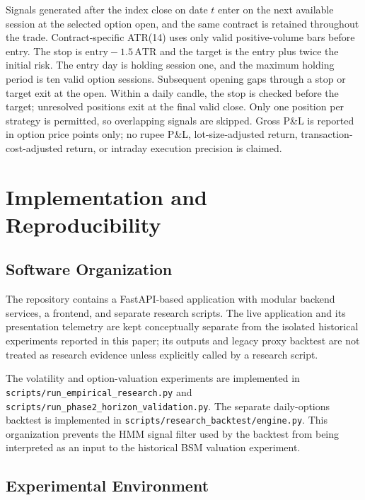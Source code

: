 \documentclass[journal]{IEEEtran}
\begin{document}
Signals generated after the index close on date $t$ enter on the next available session at the selected option open, and the same contract is retained throughout the trade. Contract-specific ATR(14) uses only valid positive-volume bars before entry. The stop is $\mathrm{entry}-1.5\,\mathrm{ATR}$ and the target is the entry plus twice the initial risk. The entry day is holding session one, and the maximum holding period is ten valid option sessions. Subsequent opening gaps through a stop or target exit at the open. Within a daily candle, the stop is checked before the target; unresolved positions exit at the final valid close. Only one position per strategy is permitted, so overlapping signals are skipped. Gross P\&L is reported in option price points only; no rupee P\&L, lot-size-adjusted return, transaction-cost-adjusted return, or intraday execution precision is claimed.

\section{Implementation and Reproducibility}

\subsection{Software Organization}

The repository contains a FastAPI-based application with modular backend services, a frontend, and separate research scripts. The live application and its presentation telemetry are kept conceptually separate from the isolated historical experiments reported in this paper; its outputs and legacy proxy backtest are not treated as research evidence unless explicitly called by a research script.

The volatility and option-valuation experiments are implemented in \texttt{scripts/run\_empirical\_research.py} and \texttt{scripts/run\_phase2\_horizon\_validation.py}. The separate daily-options backtest is implemented in \texttt{scripts/research\_backtest/engine.py}. This organization prevents the HMM signal filter used by the backtest from being interpreted as an input to the historical BSM valuation experiment.

\subsection{Experimental Environment}
\end{document}
